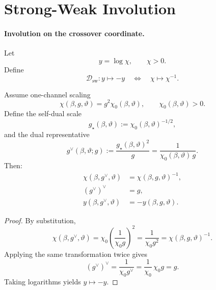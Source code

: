 \section{Strong-Weak Involution}
\label{sec:strong_weak_involution}

\paragraph{Involution on the crossover coordinate.}
Let
\begin{equation}
  y = \log \chi, \qquad \chi > 0.
\end{equation}
Define
\begin{equation}
  \mathcal{D}_{\mathrm{sw}}: y \mapsto -y
  \quad \Longleftrightarrow \quad
  \chi \mapsto \chi^{-1}.
\end{equation}

\begin{theorem}
\label{thm:strong_weak_involution}
Assume one-channel scaling
\begin{equation}
  \chi(\beta,g,\vartheta)=g^2\chi_0(\beta,\vartheta), \qquad \chi_0(\beta,\vartheta)>0.
\end{equation}
Define the self-dual scale
\begin{equation}
  g_\star(\beta,\vartheta):=\chi_0(\beta,\vartheta)^{-1/2},
\end{equation}
and the dual representative
\begin{equation}
  g^\vee(\beta,\vartheta;g):=\frac{g_\star(\beta,\vartheta)^2}{g}
  =\frac{1}{\chi_0(\beta,\vartheta)\,g}.
\end{equation}
Then:
\begin{align}
  \chi(\beta,g^\vee,\vartheta) &= \chi(\beta,g,\vartheta)^{-1}, \\
  (g^\vee)^\vee &= g, \\
  y(\beta,g^\vee,\vartheta) &= -y(\beta,g,\vartheta).
\end{align}
\end{theorem}
\begin{proof}
By substitution,
\begin{equation}
  \chi(\beta,g^\vee,\vartheta)
  =\chi_0\left(\frac{1}{\chi_0 g}\right)^2
  =\frac{1}{\chi_0 g^2}
  =\chi(\beta,g,\vartheta)^{-1}.
\end{equation}
Applying the same transformation twice gives
\begin{equation}
  (g^\vee)^\vee=\frac{1}{\chi_0 g^\vee}
  =\frac{1}{\chi_0}\,\chi_0 g
  =g.
\end{equation}
Taking logarithms yields \(y\mapsto -y\).
\end{proof}

